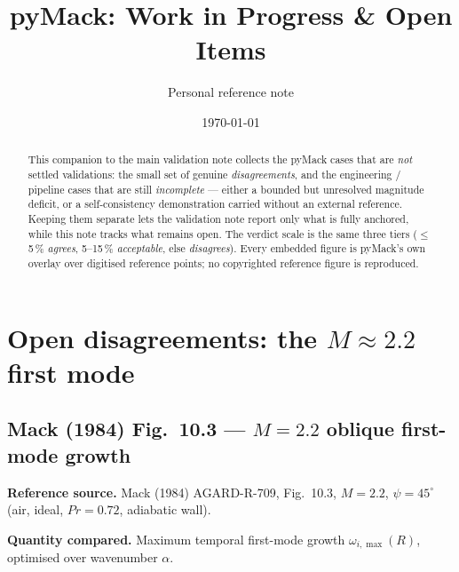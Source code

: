 \documentclass[11pt]{article}
\title{pyMack: Work in Progress \& Open Items}
\author{Personal reference note}
\date{\today}
\begin{document}
\maketitle

\begin{abstract}
This companion to the main validation note collects the pyMack cases that are
\emph{not} settled validations: the small set of genuine \emph{disagreements},
and the engineering / pipeline cases that are still \emph{incomplete} --- either
a bounded but unresolved magnitude deficit, or a self-consistency demonstration
carried without an external reference. Keeping them separate lets the validation
note report only what is fully anchored, while this note tracks what remains
open. The verdict scale is the same three tiers ($\le$\,5\,\% \emph{agrees},
5--15\,\% \emph{acceptable}, else \emph{disagrees}). Every embedded figure is
pyMack's own overlay over digitised reference points; no copyrighted reference
figure is reproduced.
\end{abstract}

\tableofcontents

\FloatBarrier
\section{Open disagreements: the $M\approx2.2$ first mode}
\label{sec:disagreements}


\subsection{Mack (1984) Fig.~10.3 --- $M=2.2$ oblique first-mode growth}
\label{sec:mack103_m22}

\textbf{Reference source.} Mack (1984) AGARD-R-709, Fig.~10.3, $M=2.2$,
$\psi=45^\circ$ (air, ideal, $Pr=0.72$, adiabatic wall).

\textbf{Quantity compared.} Maximum temporal first-mode growth
$\omega_{i,\max}(R)$, optimised over wavenumber $\alpha$.
\end{document}
